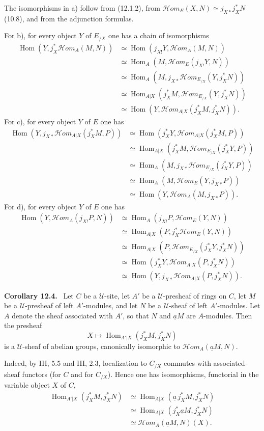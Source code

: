 \documentclass[11pt]{article}
\newcommand{\U}{\mathcal{U}}
\newcommand{\Hom}{\operatorname{Hom}}
\newcommand{\scrHom}{\mathscr{H}\!om}
\newenvironment{statement}[1]{\par\medskip\noindent\textbf{#1.}\ }{\par\medskip}
\begin{document}
The isomorphisms in a) follow from (12.1.2), from $\scrHom_E(X,N)\simeq j_{X*}j_X^*N$ (10.8), and from the adjunction formulas.

For b), for every object $Y$ of $E_{/X}$ one has a chain of isomorphisms
\begin{align*}
\Hom(Y,j_X^*\scrHom_A(M,N))
&\simeq \Hom(j_{X!}Y,\scrHom_A(M,N))\\
&\simeq \Hom_A(M,\scrHom_E(j_{X!}Y,N))\\
&\simeq \Hom_A(M,j_{X*}\scrHom_{E_{/X}}(Y,j_X^*N))\\
&\simeq \Hom_{A|X}(j_X^*M,\scrHom_{E_{/X}}(Y,j_X^*N))\\
&\simeq \Hom(Y,\scrHom_{A|X}(j_X^*M,j_X^*N)).
\end{align*}
For c), for every object $Y$ of $E$ one has
\begin{align*}
\Hom(Y,j_{X*}\scrHom_{A|X}(j_X^*M,P))
&\simeq \Hom(j_X^*Y,\scrHom_{A|X}(j_X^*M,P))\\
&\simeq \Hom_{A|X}(j_X^*M,\scrHom_{E_{/X}}(j_X^*Y,P))\\
&\simeq \Hom_A(M,j_{X*}\scrHom_{E_{/X}}(j_X^*Y,P))\\
&\simeq \Hom_A(M,\scrHom_E(Y,j_{X*}P))\\
&\simeq \Hom(Y,\scrHom_A(M,j_{X*}P)).
\end{align*}
For d), for every object $Y$ of $E$ one has
\begin{align*}
\Hom(Y,\scrHom_A(j_{X!}P,N))
&\simeq \Hom_A(j_{X!}P,\scrHom_E(Y,N))\\
&\simeq \Hom_{A|X}(P,j_X^*\scrHom_E(Y,N))\\
&\simeq \Hom_{A|X}(P,\scrHom_{E_{/X}}(j_X^*Y,j_X^*N))\\
&\simeq \Hom(j_X^*Y,\scrHom_{A|X}(P,j_X^*N))\\
&\simeq \Hom(Y,j_{X*}\scrHom_{A|X}(P,j_X^*N)).
\end{align*}

\begin{statement}{Corollary 12.4}
Let $C$ be a $\U$-site, let $A'$ be a $\U$-presheaf of rings on $C$, let $M$ be a $\U$-presheaf of left $A'$-modules, and let $N$ be a $\U$-sheaf of left $A'$-modules. Let $A$ denote the sheaf associated with $A'$, so that $N$ and $\underline aM$ are $A$-modules. Then the presheaf
\[
X\longmapsto \Hom_{A'|X}(j_X^*M,j_X^*N)
\]
is a $\U$-sheaf of abelian groups, canonically isomorphic to $\scrHom_A(\underline aM,N)$.
\end{statement}

Indeed, by III, 5.5 and III, 2.3, localization to $C_{/X}$ commutes with associated-sheaf functors (for $C$ and for $C_{/X}$). Hence one has isomorphisms, functorial in the variable object $X$ of $C$,
\begin{align*}
\Hom_{A'|X}(j_X^*M,j_X^*N)
&\simeq \Hom_{A|X}(\underline a\,j_X^*M,j_X^*N)\\
&\simeq \Hom_{A|X}(j_X^*\underline aM,j_X^*N)\\
&\simeq \scrHom_A(\underline aM,N)(X).
\end{align*}
\end{document}
